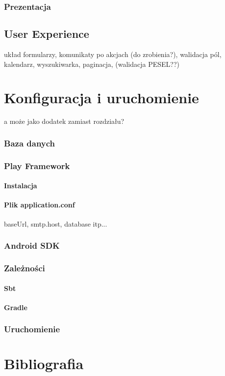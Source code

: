 \documentclass[11pt]{aghdpl}
\begin{document}
\subsection{Prezentacja}
\section{User Experience}
układ formularzy, komunikaty po akcjach (do zrobienia?), walidacja pól, kalendarz, wyszukiwarka, paginacja, (walidacja PESEL??)

\chapter{Konfiguracja i uruchomienie}
\label{cha:konfiguracja_i_uruchomienie}
a może jako dodatek zamiast rozdziału?

\subsection{Baza danych}
\subsection{Play Framework}
\subsubsection{Instalacja}
\subsubsection{Plik application.conf}
baseUrl, smtp.host, database itp...
\subsection{Android SDK}
\subsection{Zależności}
\subsubsection{Sbt}
\subsubsection{Gradle}
\subsection{Uruchomienie}

% 
% 

\chapter{Bibliografia}
\label{cha:bibliografia}



\end{document}
